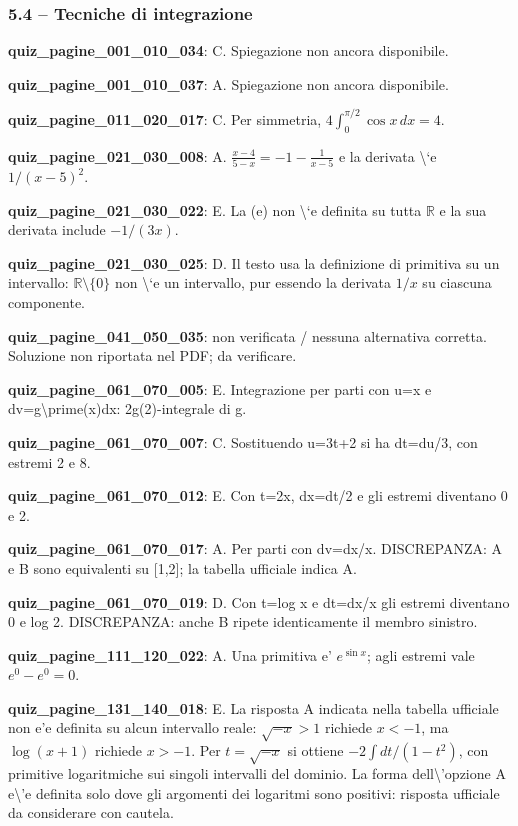 \documentclass[11pt,a4paper]{article}
\newcounter{quiz}
\begin{document}
\subsubsection*{5.4 -- Tecniche di integrazione}
\noindent\textbf{quiz\_pagine\_001\_010\_034}: C. Spiegazione non ancora disponibile.\par\medskip
\noindent\textbf{quiz\_pagine\_001\_010\_037}: A. Spiegazione non ancora disponibile.\par\medskip
\noindent\textbf{quiz\_pagine\_011\_020\_017}: C. Per simmetria, $4\int_0^{\pi/2}\cos x\,dx=4$.\par\medskip
\noindent\textbf{quiz\_pagine\_021\_030\_008}: A. $\frac{x-4}{5-x}=-1-\frac1{x-5}$ e la derivata \textbackslash{}`e $1/(x-5)^2$.\par\medskip
\noindent\textbf{quiz\_pagine\_021\_030\_022}: E. La (e) non \textbackslash{}`e definita su tutta $\mathbb R$ e la sua derivata include $-1/(3x)$.\par\medskip
\noindent\textbf{quiz\_pagine\_021\_030\_025}: D. Il testo usa la definizione di primitiva su un intervallo: $\mathbb R\setminus\{0\}$ non \textbackslash{}`e un intervallo, pur essendo la derivata $1/x$ su ciascuna componente.\par\medskip
\noindent\textbf{quiz\_pagine\_041\_050\_035}: non verificata / nessuna alternativa corretta. Soluzione non riportata nel PDF; da verificare.\par\medskip
\noindent\textbf{quiz\_pagine\_061\_070\_005}: E. Integrazione per parti con u=x e dv=g\textbackslash{}prime(x)dx: 2g(2)-integrale di g.\par\medskip
\noindent\textbf{quiz\_pagine\_061\_070\_007}: C. Sostituendo u=3t+2 si ha dt=du/3, con estremi 2 e 8.\par\medskip
\noindent\textbf{quiz\_pagine\_061\_070\_012}: E. Con t=2x, dx=dt/2 e gli estremi diventano 0 e 2.\par\medskip
\noindent\textbf{quiz\_pagine\_061\_070\_017}: A. Per parti con dv=dx/x. DISCREPANZA: A e B sono equivalenti su [1,2]; la tabella ufficiale indica A.\par\medskip
\noindent\textbf{quiz\_pagine\_061\_070\_019}: D. Con t=log x e dt=dx/x gli estremi diventano 0 e log 2. DISCREPANZA: anche B ripete identicamente il membro sinistro.\par\medskip
\noindent\textbf{quiz\_pagine\_111\_120\_022}: A. Una primitiva e' $e^{\sin x}$; agli estremi vale $e^0-e^0=0$.\par\medskip
\noindent\textbf{quiz\_pagine\_131\_140\_018}: E. La risposta A indicata nella tabella ufficiale non e'e definita su alcun intervallo reale: $\sqrt{-x}>1$ richiede $x<-1$, ma $\log(x+1)$ richiede $x>-1$. Per $t=\sqrt{-x}$ si ottiene $-2\int dt/(1-t^2)$, con primitive logaritmiche sui singoli intervalli del dominio. La forma dell\textbackslash{}'opzione A e\textbackslash{}'e definita solo dove gli argomenti dei logaritmi sono positivi: risposta ufficiale da considerare con cautela.\par\medskip
\end{document}
